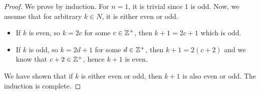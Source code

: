 \begin{exercise}[\textbf{3}]
\begin{exercise}[$\vec{8}$]
        \begin{proof} We prove by induction. For $n=1$, it is trivial since $1$ is odd.
             Now, we assume that for arbitrary $k\in N$, it is either even or odd. 
             \begin{itemize}
                 \item If $k$ is even, so $k=2c$ for some $c\in \mathbb{Z}^+$, then
                 $k+1=2c+1$ which is odd.
                 \item If $k$ is odd, so $k=2d+1$ for some $d\in \mathbb{Z}^+$, then
                 $k+1=2(c+2)$ and we know that $c+2\in \mathbb{Z}^+$, hence $k+1$ is
                 even.
             \end{itemize}
             We have shown that if $k$ is either even or odd, then $k+1$ is also
             even or odd. The induction is complete.
        \end{proof}
    \end{exercise}
\end{exercise}
